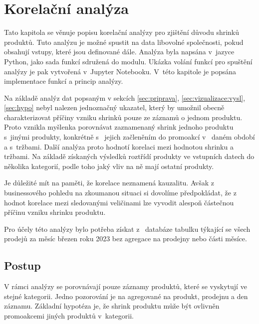 \chapter{Korelační analýza}
\label{ch:korelacnianalyza}
Tato kapitola se věnuje popisu korelační analýzy pro zjištění důvodu shrinků produktů. Tuto analýzu je možné spustit na data libovolné společnosti, pokud obsahují vstupy, které jsou definované dále. Analýza byla napsána v~jazyce Python, jako sada funkcí sdružená do modulu. Ukázka volání funkcí pro spuštění analýzy je pak vytvořená v~Jupyter Notebooku. V~této kapitole je popsána implementace funkcí a princip analýzy. 

Na základě analýz dat popsaným v sekcích \ref*{sec:priprava}, \ref*{sec:vizualizace:vysl}, \ref*{sec:hypo} nebyl nalezen jednoznačný ukazatel, který by umožnil obecně charakterizovat příčiny vzniku shrinků pouze ze záznamů o jednom produktu. Proto vznikla myšlenka porovnávat zaznamenaný shrink  jednoho produktu s~jinými produkty, konkrétně s~ jejich začleněním do promoakcí v~ daném období a s~tržbami. 
Další analýza proto hodnotí korelaci mezi hodnotou shrinku a tržbami. Na základě získaných výsledků roztřídí produkty ve vstupních datech do několika kategorií, podle toho jaký vliv na ně mají ostatní produkty.

Je důležité mít na paměti, že korelace neznamená kauzalitu. Avšak z~ businessového pohledu na zkoumanou situaci si dovolíme předpokládat, že z~ hodnot korelace mezi sledovanými veličinami lze vyvodit alespoň částečnou příčinu vzniku shrinku produktu.

Pro účely této analýzy bylo potřeba získat z~ databáze tabulku týkající se všech prodejů za měsíc březen roku 2023 bez agregace na prodejny nebo části měsíce. 




\section{Postup}
\label{sec:kor:postup}
V rámci analýzy se porovnávají pouze záznamy produktů, které se vyskytují ve stejné kategorii. Jedno pozorování je na agregované na produkt, prodejnu a den záznamu. Základní hypotéza je, že shrink produktu může být ovlivněn promoakcemi jiných produktů v~kategorii.

